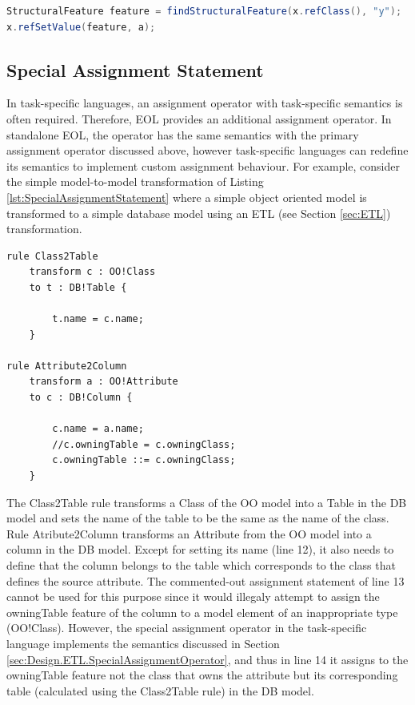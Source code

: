 \begin{lstlisting}[float=h, caption=Java code that assigns the value of a property of a model element that belongs to an MDR-based model, label=lst:MdrModelElementPropertyAssignment, language=Java]
StructuralFeature feature = findStructuralFeature(x.refClass(), "y");
x.refSetValue(feature, a);
\end{lstlisting}

\subsection{Special Assignment Statement}
\label{sec:Design.EOL.SpecialAssignmentStatement}
In task-specific languages, an assignment operator with task-specific semantics is often required. Therefore, EOL provides an additional assignment operator. In standalone EOL, the operator has the same semantics with the primary assignment operator discussed above, however task-specific languages can redefine its semantics to implement custom
assignment behaviour. For example, consider the simple model-to-model transformation of Listing \ref{lst:SpecialAssignmentStatement} where a simple object oriented model is transformed to a simple database model using an ETL (see Section \ref{sec:ETL}) transformation.

\begin{lstlisting}[float=h, caption=A simple model-to-model transformation
demonstrating the special assignment statement, label=lst:SpecialAssignmentStatement, language=ETL]
rule Class2Table
    transform c : OO!Class
    to t : DB!Table {
    
        t.name = c.name;
    }

rule Attribute2Column
    transform a : OO!Attribute
    to c : DB!Column {
    
        c.name = a.name;
        //c.owningTable = c.owningClass;
        c.owningTable ::= c.owningClass;
    }

\end{lstlisting}


The Class2Table rule transforms a Class of the OO model into a Table in the DB model and sets the name of the table to be the same as the name of the class. Rule Atribute2Column transforms an Attribute from the OO model into a column in the DB model. Except for setting its name (line 12), it also needs to define that the column belongs to the table which corresponds to the class that defines the source attribute. The commented-out assignment statement of line 13 cannot be used for this purpose since it would illegaly attempt to assign the owningTable feature of the column to a model element of an inappropriate type (OO!Class). However, the special assignment operator in the task-specific language implements the semantics discussed in Section \ref{sec:Design.ETL.SpecialAssignmentOperator}, and thus in line 14 it assigns to the owningTable feature not the class that owns the attribute but its corresponding table (calculated using the Class2Table rule) in the DB model. 



